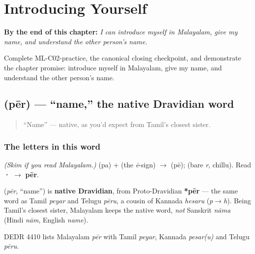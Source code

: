 
\chapter{Introducing Yourself}
\label{ch:introductions}

\begin{chapteropening}
\textbf{By the end of this chapter:} \emph{I can introduce myself in Malayalam, give my name, and understand the other person's name.}

Complete ML-C02-practice, the canonical closing checkpoint, and demonstrate the chapter promise: introduce myself in Malayalam, give my name, and understand the other person's name.
\end{chapteropening}

\section[\texorpdfstring{\ml{പേര്} (pēr)}{പേര് (pēr)}]{ (pēr) — \textquotedblleft{}name,\textquotedblright{} the native Dravidian word}

\label{lesson:ML-C02-peru}



\begin{quote}
\textquotedblleft{}Name\textquotedblright{} — native, as you'd expect from Tamil's closest sister.
\end{quote}

\subsection*{The letters in this word}
\emph{(Skim if you read Malayalam.)} \textbf{} (pa) + \textbf{} (the \emph{ē}-sign) $\to$ \textbf{} (pē); \textbf{} (bare \emph{r}, chillu). Read \textbf{·} $\to$ \textbf{pēr}.

\begin{cousinweb}
\textbf{} (\emph{pēr}, \textquotedblleft{}name\textquotedblright{}) is \textbf{native Dravidian}, from Proto-Dravidian \textbf{*pēr} — the same word as Tamil \emph{peyar} and Telugu \emph{pēru}, a cousin of Kannada \emph{hesaru} (\emph{p}$\to$\emph{h}). Being Tamil's closest sister, Malayalam keeps the native word, \emph{not} Sanskrit \emph{nāma} (Hindi \emph{nām}, English \emph{name}).

DEDR 4410 lists Malayalam \emph{pēr} with Tamil \emph{peyar}, Kannada \emph{pesar(u)} and Telugu \emph{pēru}.
\end{cousinweb}

